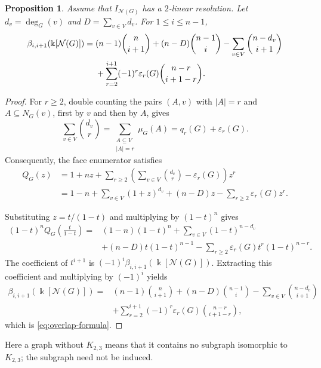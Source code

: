 \documentclass[11pt]{amsart}
\newtheorem{proposition}[theorem]{Proposition}
\theoremstyle{definition}
\theoremstyle{remark}
\numberwithin{equation}{section}
\newcommand{\NN}{\mathcal N}
\begin{document}
	\begin{proposition}\label{prop:overlap-formula}
		Assume that \(I_{\NN(G)}\) has a \(2\)-linear resolution. Let
		\(d_v=\deg_G(v)\) and \(D=\sum_{v\in V}d_v\). For
		\(1\le i\le n-1\),
		\begin{align}
			\beta_{i,i+1}(\Bbbk[\NN(G)])
			={}&(n-1)\binom n{i+1}
			+(n-D)\binom{n-1}{i}
			-\sum_{v\in V}\binom{n-d_v}{i+1}\notag\\
			&+\sum_{r=2}^{i+1}
			(-1)^r\varepsilon_r(G)
			\binom{n-r}{i+1-r}.
			\label{eq:overlap-formula}
		\end{align}
	\end{proposition}
	
	\begin{proof}
		For \(r\ge2\), double counting the pairs \((A,v)\) with \(|A|=r\) and
		\(A\subseteq N_G(v)\), first by \(v\) and then by \(A\), gives
		\[
		\sum_{v\in V}\binom{d_v}{r}
		=
		\sum_{\substack{A\subseteq V\\|A|=r}}\mu_G(A)
		=q_r(G)+\varepsilon_r(G).
		\]
		Consequently, the face enumerator satisfies
		\begin{align*}
			Q_G(z)
			&=1+nz+
			\sum_{r\ge2}
			\left(\sum_{v\in V}\binom{d_v}{r}-\varepsilon_r(G)\right)z^r\\
			&=1-n+\sum_{v\in V}(1+z)^{d_v}
			+(n-D)z-\sum_{r\ge2}\varepsilon_r(G)z^r.
		\end{align*}
		
		Substituting \(z=t/(1-t)\) and multiplying by \((1-t)^n\) gives
		\begin{align*}
			(1-t)^nQ_G\left(\frac{t}{1-t}\right)
			={}&(1-n)(1-t)^n
			+\sum_{v\in V}(1-t)^{n-d_v}\\
			&+(n-D)t(1-t)^{n-1}
			-\sum_{r\ge2}\varepsilon_r(G)t^r(1-t)^{n-r}.
		\end{align*}
		The coefficient of \(t^{i+1}\) is
		\((-1)^i\beta_{i,i+1}(\Bbbk[\NN(G)])\). Extracting this coefficient and
		multiplying by \((-1)^i\) yields
		\begin{align*}
			\beta_{i,i+1}(\Bbbk[\NN(G)])
			={}&(n-1)\binom n{i+1}
			+(n-D)\binom{n-1}{i}
			-\sum_{v\in V}\binom{n-d_v}{i+1}\\
			&+\sum_{r=2}^{i+1}
			(-1)^r\varepsilon_r(G)\binom{n-r}{i+1-r},
		\end{align*}
		which is \eqref{eq:overlap-formula}.
	\end{proof}
	

	Here a graph without \(K_{2,3}\) means that it contains no subgraph
	isomorphic to \(K_{2,3}\); the subgraph need not be induced.
\end{document}
